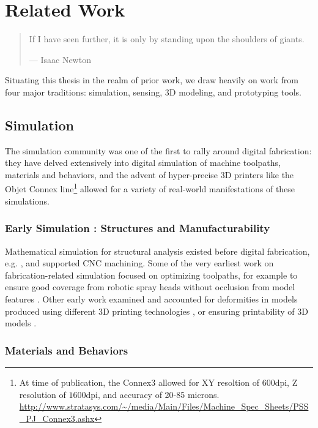 \chapter{Related Work}

\begin{quote}
If I have seen further, it is only by standing upon the shoulders of giants.

--- Isaac Newton
\end{quote}

Situating this thesis in the realm of prior work, we draw heavily on work from four major traditions: simulation, sensing, 3D modeling, and prototyping tools.

\section{Simulation}

    The simulation community was one of the first to rally around digital fabrication: they have delved extensively into digital simulation of machine toolpaths, materials and behaviors, and the advent of hyper-precise 3D printers like the Objet Connex line\footnote{At time of publication, the Connex3 allowed for XY resoltion of $600$dpi, Z resolution of $1600$dpi, and accuracy of 20-85 microns. \url{http://www.stratasys.com/~/media/Main/Files/Machine_Spec_Sheets/PSS_PJ_Connex3.ashx}} allowed for a variety of real-world manifestations of these simulations.

    \subsection{Early Simulation : Structures and Manufacturability}

    Mathematical simulation for structural analysis existed before digital fabrication, e.g. \cite{fleury-optimization}, and supported CNC machining. Some of the very earliest work on fabrication-related simulation focused on optimizing toolpaths, for example to ensure good coverage from robotic spray heads without occlusion from model features \cite{gursoz-noodles}. Other early work examined and accounted for deformities in models produced using different 3D printing technologies \cite{brown-simulate,hsu-numerical}, or ensuring printability of 3D models \cite{barequet-gaps,bohn-shellclosure}.

    \subsection{Materials and Behaviors}


